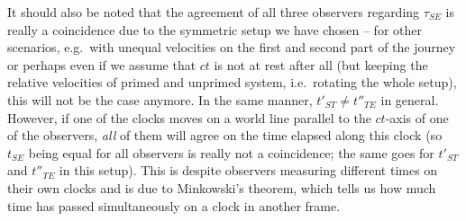 \begin{ex}
	It should also be noted that the agreement of all three observers regarding $\tau_{SE}$ is really a coincidence due to the symmetric setup we have chosen -- for other scenarios, e.g.~with unequal velocities on the first and second part of the journey or perhaps even if we assume that $ct$ is not at rest after all (but keeping the relative velocities of primed and unprimed system, i.e.~rotating the whole setup), this will not be the case anymore. In the same manner, $t'_{ST} \neq t''_{TE}$ in general. However, if one of the clocks moves on a world line parallel to the $ct$-axis of one of the observers, \emph{all} of them will agree on the time elapsed along this clock (so $t_{SE}$ being equal for all observers is really not a coincidence; the same goes for $t'_{ST}$ and $t''_{TE}$ in this setup). This is despite observers measuring different times on their own clocks and is due to Minkowski's theorem, which tells us how much time has passed simultaneously on a clock in another frame.
\end{ex}



